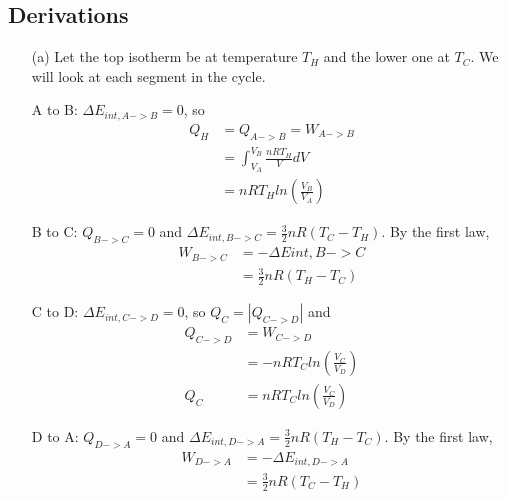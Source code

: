 \documentclass{article}
\begin{document}
\subsection{Derivations}

\begin{itemize}
	\item[(a)] Let the top isotherm be at temperature $T_H$ and the lower one at $T_C$. We will look at each segment in the cycle.
	
	A to B: $\Delta E_{int,A->B} = 0$, so
	\begin{align*}
	Q_H &= Q_{A->B} = W_{A->B} \\
	&= \int_{V_A}^{V_B}\frac{nRT_H}{V}dV \\
	&= nRT_Hln\left(\frac{V_B}{V_A}\right)
	\end{align*}
	
	B to C: $Q_{B->C} = 0$ and $\Delta E_{int,B->C} = \frac{3}{2}nR(T_C-T_H)$. By the first law,
	\begin{align*}
	W_{B->C} &= -\Delta E{int,B->C} \\
	&= \frac{3}{2}nR(T_H-T_C)
	\end{align*}
	
	C to D: $\Delta E_{int,C->D} = 0$, so $Q_C = |Q_{C->D}|$ and
	\begin{align*}
	Q_{C->D} &= W_{C->D} \\
	&= -nRT_Cln\left(\frac{V_C}{V_D}\right) \\
	Q_C &= nRT_Cln\left(\frac{V_C}{V_D}\right)
	\end{align*}
	
	D to A: $Q_{D->A} = 0$ and $\Delta E_{int,D->A} = \frac{3}{2}nR(T_H-T_C)$. By the first law,
	\begin{align*}
	W_{D->A} &= -\Delta E_{int,D->A} \\
	&= \frac{3}{2}nR(T_C-T_H)
	\end{align*}
	

\end{itemize}
\end{document}
